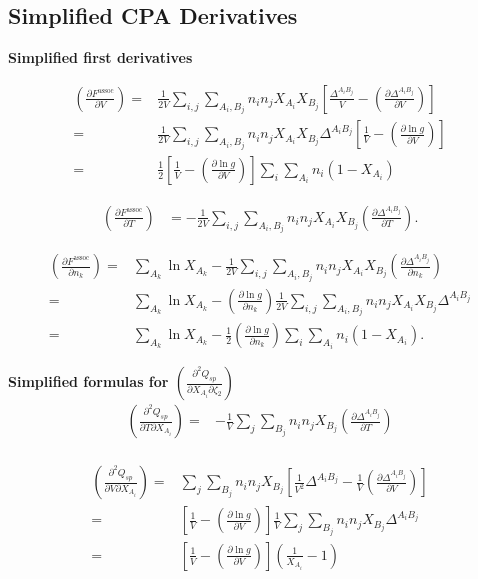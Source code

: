\documentclass[10pt, a4paper]{article}
\newcommand*{\pder}[2]{\left(\frac{\partial #1}{\partial #2}\right)}
\newcommand*{\pdcross}[3]{\left(\frac{\partial^2 #1}{\partial #2 \partial #3}\right)}
\newcommand{\z}{\zeta}
\newcommand{\lp}{\left(}
\newcommand{\rp}{\right)}
\begin{document}
\subsection{Simplified CPA Derivatives}

\textbf{Simplified first derivatives}

\begin{align}
  \pder{F^{\text{assoc}}}{V} =& \frac{1}{2V} \sum_{i,j} \sum_{A_i, B_j} n_i n_j X_{A_i} X_{B_j} \left[ \frac{\Delta^{A_i B_j}}{V} - \pder{\Delta^{A_i B_j}}{V} \right] \\
  =& \frac{1}{2V} \sum_{i,j} \sum_{A_i, B_j} n_i n_j X_{A_i} X_{B_j} \Delta^{A_i B_j} \left[ \frac{1}{V} - \pder{\ln g}{V} \right] \\
  =& \frac{1}{2} \left[ \frac{1}{V} - \pder{\ln g}{V} \right] \sum_i \sum_{A_i} n_i (1- X_{A_i})
\end{align}

\begin{align}
  \pder{F^{\text{assoc}}}{T}  &= -\frac{1}{2V} \sum_{i,j} \sum_{A_i, B_j} n_i n_j X_{A_i} X_{B_j} \pder{\Delta^{A_i B_j}}{T}.
\end{align}

\begin{align}
  \pder{F^{\text{assoc}}}{n_k} =& \sum_{A_k} \ln X_{A_k} - \frac{1}{2V} \sum_{i,j} \sum_{A_i, B_j} n_i n_j X_{A_i} X_{B_j} \pder{\Delta^{A_i B_j}}{n_k} \\
  =& \sum_{A_k} \ln X_{A_k} - \pder{\ln g}{n_k} \frac{1}{2V} \sum_{i,j} \sum_{A_i, B_j} n_i n_j X_{A_i} X_{B_j} \Delta^{A_i B_j} \\
  =& \sum_{A_k} \ln X_{A_k} - \frac{1}{2} \pder{\ln g}{n_k} \sum_{i} \sum_{A_i} n_i (1-X_{A_i}).
\end{align}


\textbf{Simplified formulas for $\pdcross{Q_{sp}}{X_{A_i}}{\z_2}$}
\begin{align*}
  \pdcross{Q_{sp}}{T}{X_{A_i}} =& -\frac{1}{V} \sum_{j} \sum_{B_j} n_i n_j X_{B_j} \pder{\Delta^{A_i B_j}}{T} \\
\end{align*}

\begin{align*}
  \pdcross{Q_{sp}}{V}{X_{A_i}} =& \sum_{j} \sum_{B_j} n_i n_j X_{B_j} \left[ \frac{1}{V^2} \Delta^{A_i B_j} - \frac{1}{V} \pder{\Delta^{A_i B_j}}{V} \right] \\
  =& \left[ \frac{1}{V}  - \pder{\ln g}{V} \right] \frac{1}{V} \sum_{j} \sum_{B_j} n_i n_j X_{B_j} \Delta^{A_i B_j} \\
  =& \left[ \frac{1}{V}  - \pder{\ln g}{V} \right] \lp \frac{1}{X_{A_i}} - 1 \rp
\end{align*}
\end{document}
